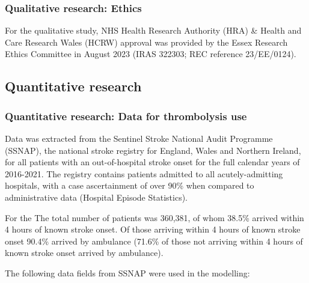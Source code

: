 \subsubsection{Qualitative research: Ethics}

For the qualitative study, NHS Health Research Authority (HRA) \& Health and Care Research Wales (HCRW) approval was provided by the Essex Research Ethics Committee in August 2023 (IRAS 322303; REC reference 23/EE/0124).

\subsection{Quantitative research}

\subsubsection{Quantitative research: Data for thrombolysis use}

Data was extracted from the Sentinel Stroke National Audit Programme (SSNAP), the national stroke registry for England, Wales and Northern Ireland, for all patients with an out-of-hospital stroke onset for the full calendar years of 2016-2021. The registry contains  patients admitted to all acutely-admitting hospitals, with a case ascertainment of over 90\% when compared to administrative data (Hospital Episode Statistics).

For the The total number of patients was 360,381, of whom 38.5\% arrived within 4 hours of known stroke onset. Of those arriving within 4 hours of known stroke onset 90.4\% arrived by ambulance (71.6\% of those not arriving within 4 hours of known stroke onset arrived by ambulance).

The following data fields from SSNAP were used in the modelling:

